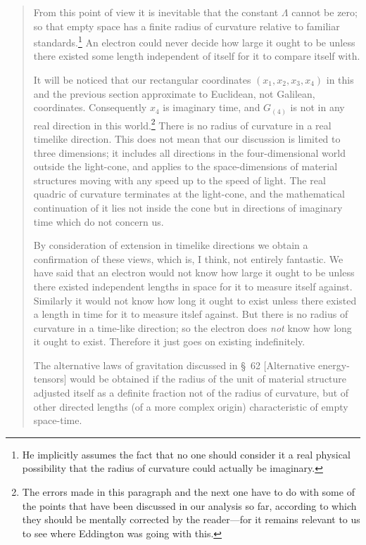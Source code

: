 \begin{quotation}
From this point of view it is inevitable that the constant $\Lambda$ cannot be zero; so that empty space has a finite radius of curvature relative to familiar standards.\footnote{He implicitly assumes the fact that no one should consider it a real physical possibility that the radius of curvature could actually be imaginary.} An electron could never decide how large it ought to be unless there existed some length independent of itself for it to compare itself with.

It will be noticed that our rectangular coordinates $(x_1, x_2, x_3, x_4)$ in this and the previous section approximate to Euclidean, not Galilean, coordinates. Consequently $x_4$ is imaginary time, and $G_{(4)}$ is not in any real direction in this world.\footnote{The errors made in this paragraph and the next one have to do with some of the points that have been discussed in our analysis so far, according to which they should be mentally corrected by the reader---for it remains relevant to us to see where Eddington was going with this.} There is no radius of curvature in a real timelike direction. This does not mean that our discussion is limited to three dimensions; it includes all directions in the four-dimensional world outside the light-cone, and applies to the space-dimensions of material structures moving with any speed up to the speed of light. The real quadric of curvature terminates at the light-cone, and the mathematical continuation of it lies not inside the cone but in directions of imaginary time which do not concern us.

By consideration of extension in timelike directions we obtain a confirmation of these views, which is, I think, not entirely fantastic. We have said that an electron would not know how large it ought to be unless there existed independent lengths in space for it to measure itself against. Similarly it would not know how long it ought to exist unless there existed a length in time for it to measure itslef against. But there is no radius of curvature in a time-like direction; so the electron does \textit{not} know how long it ought to exist. Therefore it just goes on existing indefinitely.

The alternative laws of gravitation discussed in \S~62 [Alternative energy-tensors] would be obtained if the radius of the unit of material structure adjusted itself as a definite fraction not of the radius of curvature, but of other directed lengths (of a more complex origin) characteristic of empty space-time.


\end{quotation}

